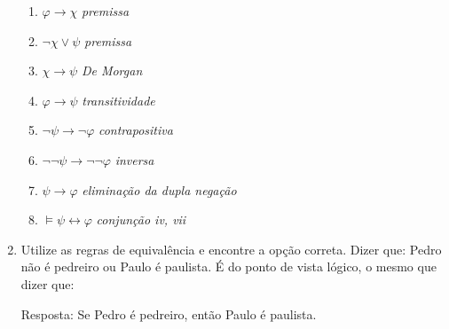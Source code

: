 \documentclass[11pt]{article}
\begin{document}
\begin{enumerate}
	\begin{enumerate}[label=\roman*]
  		\item $\varphi \rightarrow \chi$ \textit{premissa}
  		\item $\neg \chi \vee \psi$ \textit{premissa}
  		\item $\chi \rightarrow \psi $ \textit{De Morgan}
  		\item $\varphi \rightarrow  \psi$ \textit{transitividade}
  		\item $\neg \psi \rightarrow  \neg \varphi$ \textit{contrapositiva}
  		\item $\neg\neg \psi \rightarrow  \neg\neg \varphi$ \textit{inversa}
  		\item $\psi \rightarrow  \varphi$ \textit{eliminação da dupla negação}
		\item $\models \psi \leftrightarrow \varphi$  \textit{conjunção iv, vii} 
	\end{enumerate}

\item Utilize as regras de equivalência e encontre a opção correta. \smallskip 
	Dizer que: Pedro não é pedreiro ou Paulo é paulista. É do ponto de vista lógico, o mesmo que dizer que:\smallskip

	Resposta:
	Se Pedro é pedreiro, então Paulo é paulista.

\end{enumerate}
\end{document}
